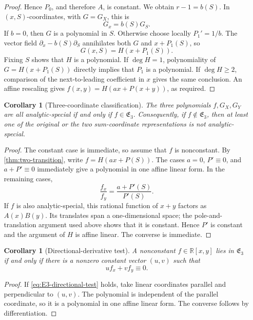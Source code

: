 \documentclass[11pt]{article}
\newtheorem{corollary}[theorem]{Corollary}
\begin{document}
\begin{proof}
Hence \(P_0\), and therefore \(A\), is constant.  We obtain
\(r-1=b(S)\).  In \((x,S)\)-coordinates, with \(G=G_X\), this is
\[
 G_x=b(S)G_S.
\]
If \(b=0\), then \(G\) is a polynomial in \(S\).  Otherwise choose
locally \(P_1'=1/b\).  The vector field
\(\partial_x-b(S)\partial_S\) annihilates both \(G\) and
\(x+P_1(S)\), so
\[
 G(x,S)=H(x+P_1(S)).
\]
Fixing \(S\) shows that \(H\) is a polynomial.  If \(\deg H=1\),
polynomiality of \(G=H(x+P_1(S))\) directly implies that \(P_1\) is a
polynomial.  If \(\deg H\ge2\), comparison of the next-to-leading
coefficient in \(x\) gives the same conclusion.  An affine rescaling gives
\(f(x,y)=H(ax+P(x+y))\), as required.
\end{proof}

\begin{corollary}[Three-coordinate classification]
\label{cor:three-coordinate}
The three polynomials \(f,G_X,G_Y\) are all analytic-special if and
only if \(f\in\mathfrak E_3\).  Consequently, if
\(f\notin\mathfrak E_3\), then at least one of the original or the
two sum-coordinate representations is not analytic-special.
\end{corollary}

\begin{proof}
The constant case is immediate, so assume that \(f\) is nonconstant.
By \cref{thm:two-transition}, write
\(f=H(ax+P(S))\).  The cases \(a=0\), \(P'\equiv0\), and
\(a+P'\equiv0\) immediately give a polynomial in one affine linear
form.  In the remaining cases,
\[
 \frac{f_x}{f_y}=\frac{a+P'(S)}{P'(S)}.
\]
If \(f\) is also analytic-special, this rational function of
\(x+y\) factors as \(A(x)B(y)\).  Its translates span a
one-dimensional space; the pole-and-translation argument used above
shows that it is constant.  Hence \(P'\) is constant and the argument
of \(H\) is affine linear.  The converse is immediate.
\end{proof}

\begin{corollary}[Directional-derivative test]
\label{cor:E3-test}
A nonconstant \(f\in\mathbb R[x,y]\) lies in \(\mathfrak E_3\) if and
only if there is a nonzero constant vector \((u,v)\) such that
\begin{equation}
 uf_x+vf_y\equiv0.
 \label{eq:E3-directional-test}
\end{equation}
\end{corollary}

\begin{proof}
If \eqref{eq:E3-directional-test} holds, take linear coordinates
parallel and perpendicular to \((u,v)\).  The polynomial is
independent of the parallel coordinate, so it is a polynomial in one
affine linear form.  The converse follows by differentiation.
\end{proof}
\end{document}
